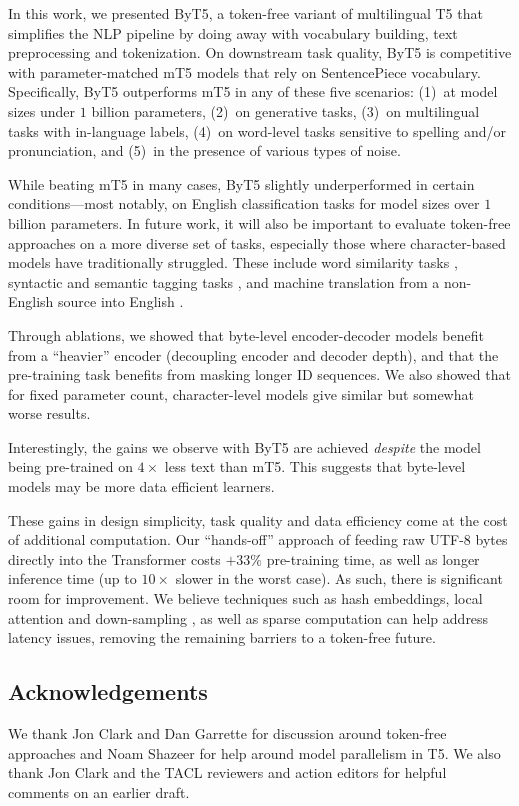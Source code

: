 \documentclass[11pt,a4paper]{article}
\begin{document}
In this work, we presented ByT5, a token-free variant of multilingual T5 \cite{mt5} that simplifies the NLP pipeline by doing away with vocabulary building, text preprocessing and tokenization. On downstream task quality, ByT5 is competitive with parameter-matched mT5 models that rely on SentencePiece vocabulary. Specifically, ByT5 outperforms mT5 in any of these five scenarios: (1)~at model sizes under $1$ billion parameters, (2)~on generative tasks, (3)~on multilingual tasks with in-language labels, (4)~on word-level tasks sensitive to spelling and/or pronunciation, and (5)~in the presence of various types of noise.

While beating mT5 in many cases, ByT5 slightly underperformed in certain conditions---most notably, on English classification tasks for model sizes over $1$ billion parameters. In future work, it will also be important to evaluate token-free approaches on a more diverse set of tasks, especially those where character-based models have traditionally struggled. These include word similarity tasks \cite{hiebert-etal-2018-interpreting}, syntactic and semantic tagging tasks \cite{durrani-etal-2019-one}, and machine translation from a non-English source into English \cite{shaham-levy-2021-neural}.

Through ablations, we showed that byte-level encoder-decoder models benefit from a ``heavier'' encoder (decoupling encoder and decoder depth), and that the pre-training task benefits from masking longer ID sequences. We also showed that for fixed parameter count, character-level models give similar but somewhat worse results.

Interestingly, the gains we observe with ByT5 are achieved \emph{despite} the model being pre-trained on $4\times$ less text than mT5. This suggests that byte-level models may be more data efficient learners.

These gains in design simplicity, task quality and data efficiency come at the cost of additional computation. Our ``hands-off'' approach of feeding raw UTF-8 bytes directly into the Transformer costs $+33\%$ pre-training time, as well as longer inference time (up to $10\times$ slower in the worst case). As such, there is significant room for improvement. We believe techniques such as hash embeddings, local attention and down-sampling \cite{clark2021canine}, as well as sparse computation \cite{fedus-2021-switch} can help address latency issues, removing the remaining barriers to a token-free future.

\subsection*{Acknowledgements}

We thank Jon Clark and Dan Garrette for discussion around token-free approaches and Noam Shazeer for help around model parallelism in T5. We also thank Jon Clark and the TACL reviewers and action editors for helpful comments on an earlier draft.



\end{document}
